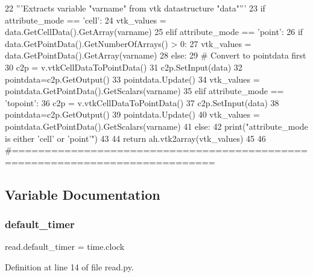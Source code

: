 \begin{DoxyCode}
22     \textcolor{stringliteral}{'''Extracts variable "varname" from vtk datastructure "data"'''}
23     \textcolor{keywordflow}{if} attribute\_mode == \textcolor{stringliteral}{'cell'}:
24         vtk\_values = data.GetCellData().GetArray(varname)
25     \textcolor{keywordflow}{elif} attribute\_mode == \textcolor{stringliteral}{'point'}:
26         \textcolor{keywordflow}{if} data.GetPointData().GetNumberOfArrays() > 0:
27             vtk\_values = data.GetPointData().GetArray(varname)
28         \textcolor{keywordflow}{else}:
29             \textcolor{comment}{# Convert to pointdata first}
30             c2p = v.vtkCellDataToPointData()
31             c2p.SetInput(data)
32             pointdata=c2p.GetOutput()
33             pointdata.Update()
34             vtk\_values = pointdata.GetPointData().GetScalars(varname)
35     \textcolor{keywordflow}{elif} attribute\_mode == \textcolor{stringliteral}{'topoint'}:
36         c2p = v.vtkCellDataToPointData()
37         c2p.SetInput(data)
38         pointdata=c2p.GetOutput()
39         pointdata.Update()
40         vtk\_values = pointdata.GetPointData().GetScalars(varname)
41     \textcolor{keywordflow}{else}:
42         print(\textcolor{stringliteral}{"attribute\_mode is either 'cell' or 'point'"})
43     
44     \textcolor{keywordflow}{return} ah.vtk2array(vtk\_values)
45 
46 \textcolor{comment}{#=============================================================================}
\end{DoxyCode}


\subsection{Variable Documentation}
\mbox{\label{namespaceread_a0ffc2818a4b9a8753985d1fd9095e02f}} 
\subsubsection{\texorpdfstring{default\+\_\+timer}{default\_timer}}
{\footnotesize\ttfamily read.\+default\+\_\+timer = time.\+clock}



Definition at line 14 of file read.\+py.


